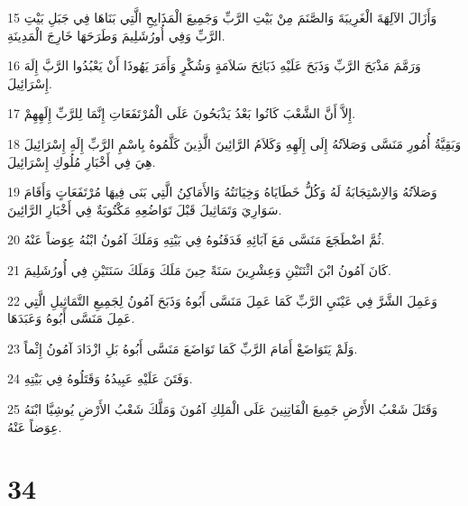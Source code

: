 \par 15 وَأَزَالَ الآلِهَةَ الْغَرِيبَةَ وَالصَّنَمَ مِنْ بَيْتِ الرَّبِّ وَجَمِيعَ الْمَذَابِحِ الَّتِي بَنَاهَا فِي جَبَلِ بَيْتِ الرَّبِّ وَفِي أُورُشَلِيمَ وَطَرَحَهَا خَارِجَ الْمَدِينَةِ.
\par 16 وَرَمَّمَ مَذْبَحَ الرَّبِّ وَذَبَحَ عَلَيْهِ ذَبَائِحَ سَلاَمَةٍ وَشُكْرٍ وَأَمَرَ يَهُوذَا أَنْ يَعْبُدُوا الرَّبَّ إِلَهَ إِسْرَائِيلَ.
\par 17 إِلاَّ أَنَّ الشَّعْبَ كَانُوا بَعْدُ يَذْبَحُونَ عَلَى الْمُرْتَفَعَاتِ إِنَّمَا لِلرَّبِّ إِلَهِهِمْ.
\par 18 وَبَقِيَّةُ أُمُورِ مَنَسَّى وَصَلاَتُهُ إِلَى إِلَهِهِ وَكَلاَمُ الرَّائِينَ الَّذِينَ كَلَّمُوهُ بِاسْمِ الرَّبِّ إِلَهِ إِسْرَائِيلَ هِيَ فِي أَخْبَارِ مُلُوكِ إِسْرَائِيلَ.
\par 19 وَصَلاَتُهُ وَالاِسْتِجَابَةُ لَهُ وَكُلُّ خَطَايَاهُ وَخِيَانَتُهُ وَالأَمَاكِنُ الَّتِي بَنَى فِيهَا مُرْتَفَعَاتٍ وَأَقَامَ سَوَارِيَ وَتَمَاثِيلَ قَبْلَ تَوَاضُعِهِ مَكْتُوبَةٌ فِي أَخْبَارِ الرَّائِينَ.
\par 20 ثُمَّ اضْطَجَعَ مَنَسَّى مَعَ آبَائِهِ فَدَفَنُوهُ فِي بَيْتِهِ وَمَلَكَ آمُونُ ابْنُهُ عِوَضاً عَنْهُ.
\par 21 كَانَ آمُونُ ابْنَ اثْنَتَيْنِ وَعِشْرِينَ سَنَةً حِينَ مَلَكَ وَمَلَكَ سَنَتَيْنِ فِي أُورُشَلِيمَ.
\par 22 وَعَمِلَ الشَّرَّ فِي عَيْنَيِ الرَّبِّ كَمَا عَمِلَ مَنَسَّى أَبُوهُ وَذَبَحَ آمُونُ لِجَمِيعِ التَّمَاثِيلِ الَّتِي عَمِلَ مَنَسَّى أَبُوهُ وَعَبَدَهَا.
\par 23 وَلَمْ يَتَوَاضَعْ أَمَامَ الرَّبِّ كَمَا تَوَاضَعَ مَنَسَّى أَبُوهُ بَلِ ازْدَادَ آمُونُ إِثْماً.
\par 24 وَفَتَنَ عَلَيْهِ عَبِيدُهُ وَقَتَلُوهُ فِي بَيْتِهِ.
\par 25 وَقَتَلَ شَعْبُ الأَرْضِ جَمِيعَ الْفَاتِنِينَ عَلَى الْمَلِكِ آمُونَ وَمَلَّكَ شَعْبُ الأَرْضِ يُوشِيَّا ابْنَهُ عِوَضاً عَنْهُ.

\chapter{34}

